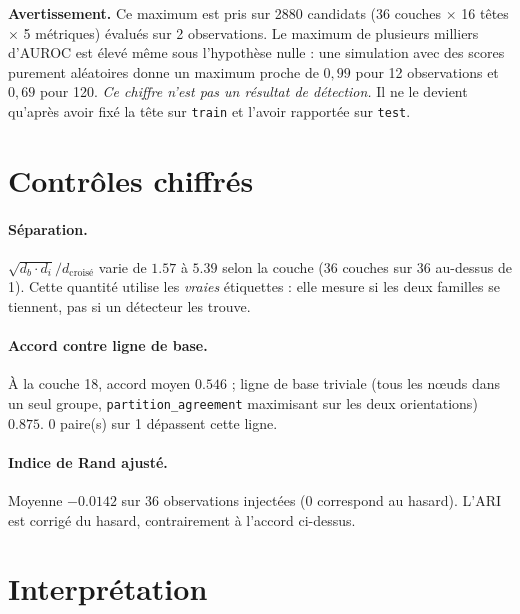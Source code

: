 \documentclass[11pt,a4paper]{article}
\begin{document}
\textbf{Avertissement.} Ce maximum est pris sur 2880 candidats
(36 couches $\times$ 16 têtes
$\times$ 5 métriques) évalués sur 2
observations. Le maximum de plusieurs milliers d'AUROC est élevé même sous
l'hypothèse nulle : une simulation avec des scores purement aléatoires donne
un maximum proche de $0{,}99$ pour 12 observations et $0{,}69$ pour 120.
\emph{Ce chiffre n'est pas un résultat de détection.} Il ne le devient
qu'après avoir fixé la tête sur \texttt{train} et l'avoir rapportée sur
\texttt{test}.


\section{Contrôles chiffrés}


\paragraph{Séparation.} $\sqrt{d_b \cdot d_i} / d_{\text{croisé}}$ varie
de $1.57$ à $5.39$ selon la couche
(36 couches sur 36 au-dessus de 1).
Cette quantité utilise les \emph{vraies} étiquettes : elle mesure si les deux
familles se tiennent, pas si un détecteur les trouve.



\paragraph{Accord contre ligne de base.} À la couche 18, accord moyen
$0.546$ ; ligne de base triviale (tous les n\oe uds dans
un seul groupe, \texttt{partition\_agreement} maximisant sur les deux
orientations) $0.875$.
0 paire(s) sur 1 dépassent cette ligne.



\paragraph{Indice de Rand ajusté.} Moyenne $-0.0142$ sur
36 observations injectées (0 correspond au hasard). L'ARI est corrigé
du hasard, contrairement à l'accord ci-dessus.


\section{Interprétation}


\end{document}
